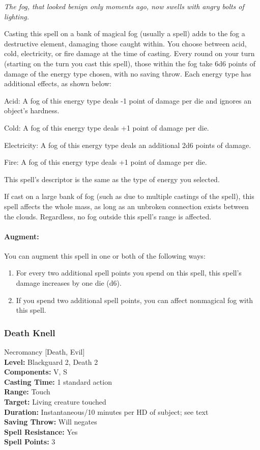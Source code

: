 \emph{The fog, that looked benign only moments ago, now swells with angry bolts of lighting.}

Casting this spell on a bank of magical fog (usually a  spell) adds to the fog a destructive element, damaging those caught within.
You choose between acid, cold, electricity, or fire damage at the time of casting. 
Every round on your turn (starting on the turn you cast this spell), 
those within the fog take 6d6 points of damage of the energy type chosen, with no saving throw.
Each energy type has additional effects, as shown below:
\begin{list}{}{\leftmargin=1em}
 \item Acid: A fog of this energy type deals -1 point of damage per die and ignores an object's hardness.
 \item Cold: A fog of this energy type deals +1 point of damage per die. 
 \item Electricity: A fog of this energy type deals an additional 2d6 points of damage.
 \item Fire: A fog of this energy type deals +1 point of damage per die.
\end{list}
This spell's descriptor is the same as the type of energy you selected.

If cast on a large bank of fog (such as due to multiple castings of the   spell), 
this spell affects the whole mass, as long as an unbroken connection exists between the clouds.
Regardless, no fog outside this spell's range is affected.

\paragraph{Augment:} You can augment this spell in one or both of the following ways:
\begin{enumerate}
 \item For every two additional spell points you spend on this spell, this spell's damage increases by one die (d6).
 \item If you spend two additional spell points, you can affect nonmagical fog with this spell.
\end{enumerate}
\subsubsection{Death Knell}
\label{Spell:DeathKnell}
Necromancy [Death, Evil]
\\ \textbf{Level:} Blackguard 2, Death 2
\\ \textbf{Components:} V, S
\\ \textbf{Casting Time:} 1 standard action
\\ \textbf{Range:} Touch
\\ \textbf{Target:} Living creature touched
\\ \textbf{Duration:} Instantaneous/10 minutes per HD of subject; see text
\\ \textbf{Saving Throw:} Will negates
\\ \textbf{Spell Resistance:} Yes
\\ \textbf{Spell Points:} 3

